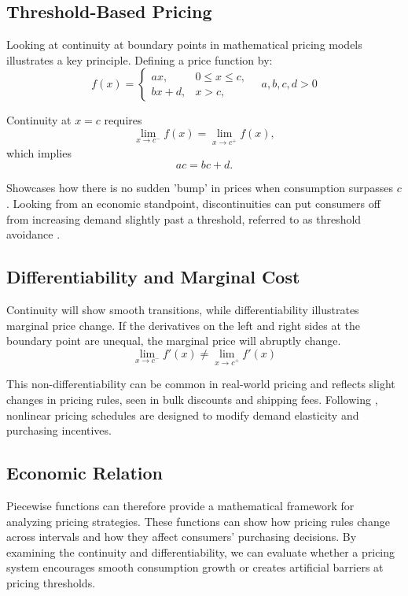 \documentclass{article}
\begin{document}
\subsection{Threshold-Based Pricing}
Looking at continuity at boundary points in mathematical pricing models illustrates a key principle. Defining a price function by:
\begin{equation*}
f(x) =
\begin{cases}
ax, & 0 \le x \le c, \\
bx + d, & x > c,
\end{cases}
\quad a,b,c,d > 0
\end{equation*}

Continuity at $x = c$ requires
\begin{equation*}
\lim_{x \to c^-} f(x) = \lim_{x \to c^+} f(x),
\end{equation*}
which implies
\begin{equation*}
ac = bc + d.
\end{equation*}

Showcases how there is no sudden ’bump’ in prices when consumption surpasses $c$. Looking from an economic standpoint, discontinuities can put consumers off from increasing demand slightly past a threshold, referred to as threshold avoidance \textcite{Lehner2025}.

\subsection{Differentiability and Marginal Cost}
Continuity will show smooth transitions, while differentiability illustrates marginal price change. If the derivatives on the left and right sides at the boundary point are unequal, the marginal price will abruptly change. 
\[
\lim_{x \to c^-} f'(x) \neq \lim_{x \to c^+} f'(x)
\]

This non-differentiability can be common in real-world pricing and reflects slight changes in pricing rules, seen in bulk discounts and shipping fees. Following \textcite{radic2024}, nonlinear pricing schedules are designed to modify demand elasticity and purchasing incentives.


\subsection{Economic Relation}
Piecewise functions can therefore provide a mathematical framework for analyzing pricing strategies. These functions can show how pricing rules change across intervals and how they affect consumers’ purchasing decisions. By examining the continuity and differentiability, we can evaluate whether a pricing system encourages smooth consumption growth or creates artificial barriers at pricing thresholds.
\end{document}
